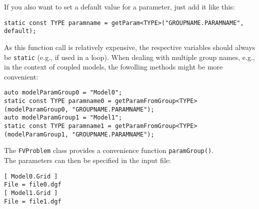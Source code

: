 If you also want to set a default value for a parameter, just add it like this:

\begin{lstlisting}[name=propsyscars,style=DumuxCode]
static const TYPE paramname = getParam<TYPE>("GROUPNAME.PARAMNAME", default);
\end{lstlisting}

As this function call is relatively expensive, the respective variables should always be \texttt{static} (e.g., if used in a loop). When dealing with multiple group names, e.g., in the context of coupled models, the fowolling methods might be more convenient:

\begin{lstlisting}[name=propsyscars,style=DumuxCode]
auto modelParamGroup0 = "Model0";
static const TYPE paramname0 = getParamFromGroup<TYPE>(modelParamGroup0, "GROUPNAME.PARAMNAME");
auto modelParamGroup1 = "Model1";
static const TYPE paramname1 = getParamFromGroup<TYPE>(modelParamGroup1, "GROUPNAME.PARAMNAME");
\end{lstlisting}

The \texttt{FVProblem} class provides a convenience function \texttt{paramGroup()}.\\

The parameters can then be specified in the input file:

\begin{lstlisting}[style=Bash]
[ Model0.Grid ]
File = file0.dgf
[ Model1.Grid ]
File = file1.dgf
\end{lstlisting}

